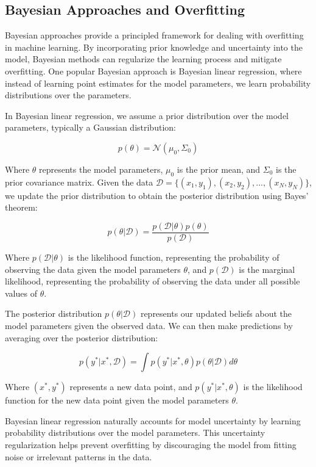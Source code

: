 \documentclass[12pt]{book} %
\begin{document}
\subsection{Bayesian Approaches and Overfitting}

Bayesian approaches provide a principled framework for dealing with overfitting in machine learning. By incorporating prior knowledge and uncertainty into the model, Bayesian methods can regularize the learning process and mitigate overfitting. One popular Bayesian approach is Bayesian linear regression, where instead of learning point estimates for the model parameters, we learn probability distributions over the parameters.

In Bayesian linear regression, we assume a prior distribution over the model parameters, typically a Gaussian distribution:

\[
p(\theta) = \mathcal{N}(\mu_0, \Sigma_0)
\]

Where \( \theta \) represents the model parameters, \( \mu_0 \) is the prior mean, and \( \Sigma_0 \) is the prior covariance matrix. Given the data \( \mathcal{D} = \{(x_1, y_1), (x_2, y_2), ..., (x_N, y_N)\} \), we update the prior distribution to obtain the posterior distribution using Bayes' theorem:

\[
p(\theta | \mathcal{D}) = \frac{p(\mathcal{D} | \theta) p(\theta)}{p(\mathcal{D})}
\]

Where \( p(\mathcal{D} | \theta) \) is the likelihood function, representing the probability of observing the data given the model parameters \( \theta \), and \( p(\mathcal{D}) \) is the marginal likelihood, representing the probability of observing the data under all possible values of \( \theta \).

The posterior distribution \( p(\theta | \mathcal{D}) \) represents our updated beliefs about the model parameters given the observed data. We can then make predictions by averaging over the posterior distribution:

\[
p(y^* | x^*, \mathcal{D}) = \int p(y^* | x^*, \theta) p(\theta | \mathcal{D}) d\theta
\]

Where \( (x^*, y^*) \) represents a new data point, and \( p(y^* | x^*, \theta) \) is the likelihood function for the new data point given the model parameters \( \theta \).

Bayesian linear regression naturally accounts for model uncertainty by learning probability distributions over the model parameters. This uncertainty regularization helps prevent overfitting by discouraging the model from fitting noise or irrelevant patterns in the data.
\end{document}
